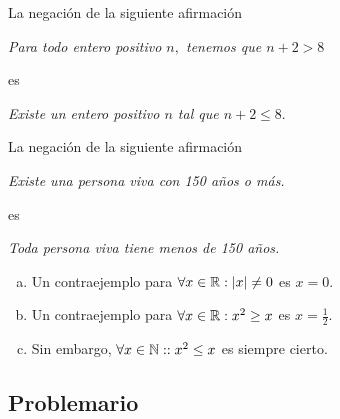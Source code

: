  \begin{ejemplo}
  \label{lip:exmp:4.10.a}
  La negación de la siguiente afirmación
  \begin{center}
   \emph{Para todo entero positivo $n,$ tenemos que $n+2>8$}
  \end{center}
es 
\begin{center}
 \emph{Existe un entero positivo $n$ tal que $n+2 \leq 8.$}
\end{center}

 \end{ejemplo}




 \begin{ejemplo}
  \label{lip:exmp:4.10.b}
  La negación de la siguiente afirmación
  \begin{center}
   \emph{Existe una persona viva con 150 a\~nos o más.}
  \end{center}
 es 
 \begin{center}
  \emph{Toda persona viva tiene menos de 150 a\~nos.}
 \end{center}

 \end{ejemplo}








 \begin{ejemplo}
 \label{lip:4.11}
  \begin{enumerate}[(a)]
   \item 
  Un contraejemplo para $\forall x \in \mathbb{R}: \left|x\right|\neq 0$ es $x=0.$  
   \item 
  Un contraejemplo para $\forall x \in \mathbb{R}: x^{2}\geq x$ es $x=\frac{1}{2}.$  
   \item 
  Sin embargo, $\forall x \in \mathbb{N}: : x^{2}\leq x$ es siempre cierto.
  \end{enumerate}

 \end{ejemplo}



\subsection{Problemario}

